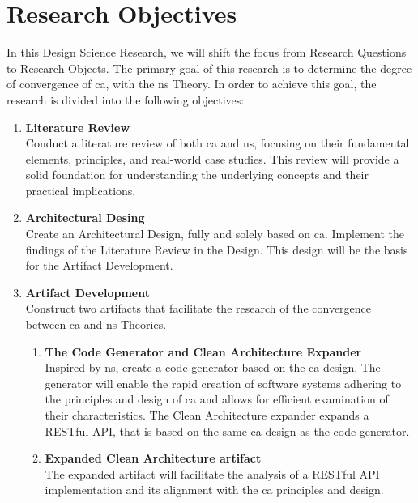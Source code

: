 \section{Research Objectives} \label{sec_research_objectives}

In this Design Science Research, we will shift the focus from Research Questions to
Research Objects. The primary goal of this research is to determine the degree of
convergence of \gls{ca}, with the \gls{ns} Theory. In order to achieve this goal, the
research is divided into the following objectives:

\begin{enumerate}
    \item \textbf{Literature Review} \\
    Conduct a literature review of both \gls{ca} and \gls{ns}, focusing on their
    fundamental elements, principles, and real-world case studies. This review will
    provide a solid foundation for understanding the underlying concepts and their
    practical implications.
    
    \item \textbf{Architectural Desing} \\
    Create an Architectural Design, fully and solely based on \gls{ca}. Implement the
    findings of the Literature Review in the Design. This design will be the basis for
    the Artifact Development.

    \item \textbf{Artifact Development} \\
    Construct two artifacts that facilitate the research of the convergence
    between \gls{ca} and \gls{ns} Theories.
    \begin{enumerate}[label*={\arabic*.}]
        
        \item \textbf{The Code Generator and Clean Architecture Expander} \\
        Inspired by \gls{ns}, create a code generator based on the \gls{ca} design. The
        generator will enable the rapid creation of software systems adhering to the
        principles and design of \gls{ca} and allows for efficient examination
        of their characteristics. The Clean Architecture expander expands a RESTful API,
        that is based on the same \gls{ca} design as the code generator. 
        
        \item \textbf{Expanded Clean Architecture artifact} \\
        The expanded artifact will facilitate the analysis of a RESTful API implementation
        and its alignment with the \gls{ca} principles and design.
        

\end{enumerate}
\end{enumerate}
